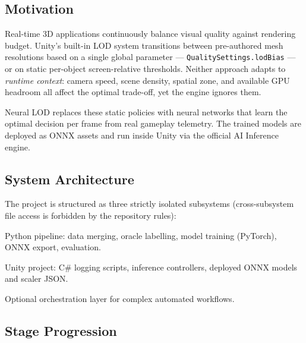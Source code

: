 \documentclass[12pt, a4paper]{article}
\begin{document}
\subsection{Motivation}

Real-time 3D applications continuously balance visual quality against rendering
budget. Unity's built-in LOD system transitions between pre-authored mesh
resolutions based on a single global parameter — \texttt{QualitySettings.lodBias}
— or on static per-object screen-relative thresholds. Neither approach adapts to
\emph{runtime context}: camera speed, scene density, spatial zone, and available
GPU headroom all affect the optimal trade-off, yet the engine ignores them.

Neural LOD replaces these static policies with neural networks that learn the
optimal decision per frame from real gameplay telemetry. The trained models are
deployed as ONNX assets and run inside Unity via the official AI Inference engine.

\subsection{System Architecture}

The project is structured as three strictly isolated subsystems (cross-subsystem
file access is forbidden by the repository rules):

\begin{description}[leftmargin=2cm, labelwidth=1.8cm]
  \item[\texttt{/ml\_pipeline}] Python pipeline: data merging, oracle labelling,
    model training (PyTorch), ONNX export, evaluation.
  \item[\texttt{/Assets}] Unity project: C\# logging scripts, inference controllers,
    deployed ONNX models and scaler JSON.
  \item[\texttt{/LLM\_Integration}] Optional orchestration layer for complex
    automated workflows.
\end{description}

\subsection{Stage Progression}
\end{document}
